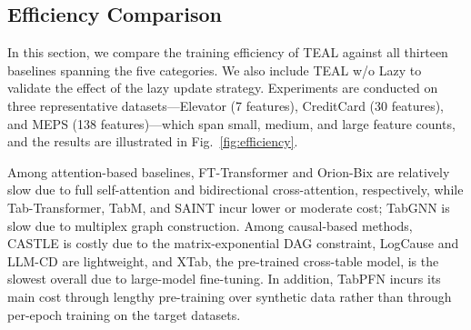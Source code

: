 \documentclass[conference]{IEEEtran}
\newcommand{\syfix}[1]{{\color{black}#1}}
\newcommand{\syic}[1]{{\color{black}#1}}
\newcommand{\syone}[1]{{\color{black}#1}}
\newcommand*{\ourmodel}{TEAL}
\begin{document}
\subsection{Efficiency Comparison}
\syfix{
In this section, we compare the training efficiency of \ourmodel{} against all \syic{thirteen} baselines spanning the \syic{five} categories. 
We also include \ourmodel{} w/o Lazy to validate the effect of the lazy update strategy.
Experiments are conducted on three representative datasets---Elevator (7 features), CreditCard (30 features), and MEPS (138 features)---which span small, medium, and large feature counts, and the results are illustrated in Fig.~\ref{fig:efficiency}.
}

\syic{
Among attention-based baselines, FT-Transformer and Orion-Bix are relatively slow due to full self-attention and bidirectional cross-attention, respectively, while Tab-Transformer, TabM, and SAINT incur lower or moderate cost; TabGNN is slow due to multiplex graph construction. Among causal-based methods, CASTLE is costly due to the matrix-exponential DAG constraint, LogCause and LLM-CD are lightweight, and XTab, the pre-trained cross-table model, is the slowest overall due to large-model fine-tuning.
}
\syone{In addition, TabPFN incurs its main cost through lengthy pre-training over synthetic data rather than through per-epoch training on the target datasets.
}
\end{document}
